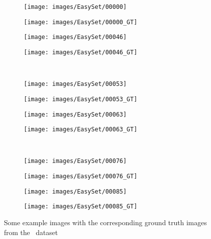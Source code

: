 \begin{figure}[t]
  \centering
  \begin{subfigure}[c]{0.24\textwidth}
    \centering
    \texttt{[image: images/EasySet/00000]}
  \end{subfigure}
  \begin{subfigure}[c]{0.24\textwidth}
    \centering
    \texttt{[image: images/EasySet/00000\_GT]}
  \end{subfigure}
  \begin{subfigure}[c]{0.24\textwidth}
    \centering
    \texttt{[image: images/EasySet/00046]}
  \end{subfigure}
  \begin{subfigure}[c]{0.24\textwidth}
    \centering
    \texttt{[image: images/EasySet/00046\_GT]}
  \end{subfigure}
  \\
  \begin{subfigure}[c]{0.24\textwidth}
    \centering
    \texttt{[image: images/EasySet/00053]}
  \end{subfigure}
  \begin{subfigure}[c]{0.24\textwidth}
    \centering
    \texttt{[image: images/EasySet/00053\_GT]}
  \end{subfigure}
  \begin{subfigure}[c]{0.24\textwidth}
    \centering
    \texttt{[image: images/EasySet/00063]}
  \end{subfigure}
  \begin{subfigure}[c]{0.24\textwidth}
    \centering
    \texttt{[image: images/EasySet/00063\_GT]}
  \end{subfigure}
  \\
  \begin{subfigure}[c]{0.24\textwidth}
    \centering
    \texttt{[image: images/EasySet/00076]}
  \end{subfigure}
  \begin{subfigure}[c]{0.24\textwidth}
    \centering
    \texttt{[image: images/EasySet/00076\_GT]}
  \end{subfigure}
  \begin{subfigure}[c]{0.24\textwidth}
    \centering
    \texttt{[image: images/EasySet/00085]}
  \end{subfigure}
  \begin{subfigure}[c]{0.24\textwidth}
    \centering
    \texttt{[image: images/EasySet/00085\_GT]}
  \end{subfigure}
  \caption{Some example images with the corresponding ground truth images from the~\cite{Wojek2008} dataset}\label{fig:Wojek_examples}
\end{figure}

